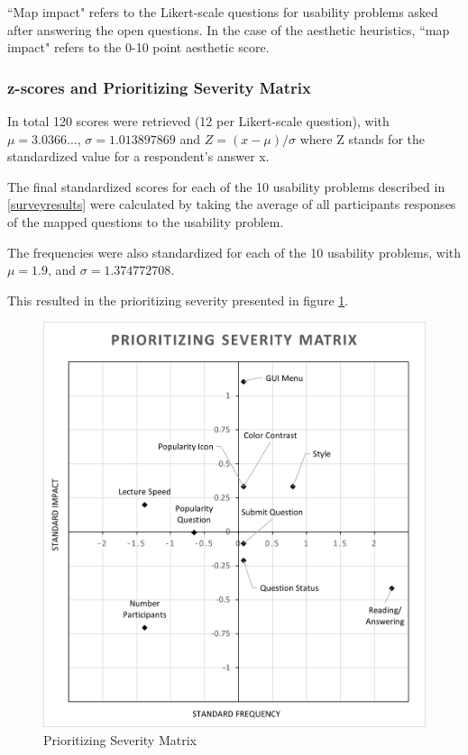 \documentclass{article}
\begin{document}
``Map impact" refers to the Likert-scale questions for usability problems asked after answering the open questions.
In the case of the aesthetic heuristics, ``map impact" refers to the 0-10 point aesthetic score.

\subsubsection{z-scores and Prioritizing  Severity Matrix\label{severityanalysis}}

In total 120 scores were retrieved (12 per Likert-scale question), with $\mu = 3.0366\dots$, $\sigma=1.013897869$ and $Z=(x-\mu)/\sigma$ where
Z stands for the standardized value for a respondent's answer x.

The final standardized scores for each of the 10 usability problems described in \ref{surveyresults} were calculated by taking the
average of all participants responses of the mapped questions to the usability problem.

The frequencies were also standardized for each of the 10 usability problems, with $\mu = 1.9$, and $\sigma=1.374772708$.

This resulted in the prioritizing severity presented in figure \ref{severitymatrix}.

\begin{figure}
    \centering
    \includegraphics[width=\textwidth]{matrix.png}
    \caption{Prioritizing Severity Matrix}
    \label{severitymatrix}
\end{figure}
\end{document}
